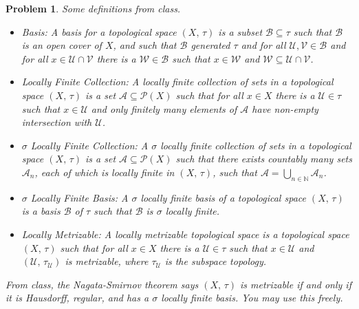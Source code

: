 \documentclass{article}
\theoremstyle{normal}
\newtheorem{problem}{Problem}
\begin{document}
    \begin{problem}
        Some definitions from class.
        \begin{itemize}
            \item Basis: A basis for a topological space $(X,\,\tau)$ is a
                subset $\mathcal{B}\subseteq\tau$ such that $\mathcal{B}$ is an
                open cover of $X$, and such that $\mathcal{B}$ generated $\tau$
                and for all $\mathcal{U},\mathcal{V}\in\mathcal{B}$ and for all
                $x\in\mathcal{U}\cap\mathcal{V}$ there is a
                $\mathcal{W}\in\mathcal{B}$ such that $x\in\mathcal{W}$ and
                $\mathcal{W}\subseteq\mathcal{U}\cap\mathcal{V}$.
            \item Locally Finite Collection: A locally finite collection of
                sets in a topological space $(X,\,\tau)$ is a set
                $\mathcal{A}\subseteq\mathcal{P}(X)$ such that for all $x\in{X}$
                there is a $\mathcal{U}\in\tau$ such that $x\in\mathcal{U}$ and
                only finitely many elements of $\mathcal{A}$ have non-empty
                intersection with $\mathcal{U}$.
            \item $\sigma$ Locally Finite Collection: A $\sigma$ locally finite
                collection of sets in a topological space $(X,\,\tau)$ is a set
                $\mathcal{A}\subseteq\mathcal{P}(X)$ such that there exists
                countably many sets $\mathcal{A}_{n}$, each of which is locally
                finite in $(X,\,\tau)$, such that
                $\mathcal{A}=\bigcup_{n\in\mathbb{N}}\mathcal{A}_{n}$.
            \item $\sigma$ Locally Finite Basis: A $\sigma$ locally finite
                basis of a topological space $(X,\,\tau)$ is a basis
                $\mathcal{B}$ of $\tau$ such that $\mathcal{B}$ is $\sigma$
                locally finite.
            \item Locally Metrizable: A locally metrizable topological space
                is a topological space $(X,\,\tau)$ such that for all $x\in{X}$
                there is a $\mathcal{U}\in\tau$ such that $x\in\mathcal{U}$ and
                $(\mathcal{U},\,\tau_{\mathcal{U}})$ is metrizable, where
                $\tau_{\mathcal{U}}$ is the subspace topology.
        \end{itemize}
        From class, the Nagata-Smirnov theorem says $(X,\,\tau)$ is metrizable
        if and only if it is Hausdorff, regular,
        and has a $\sigma$ locally finite basis. You may use this freely.

\end{problem}
\end{document}
